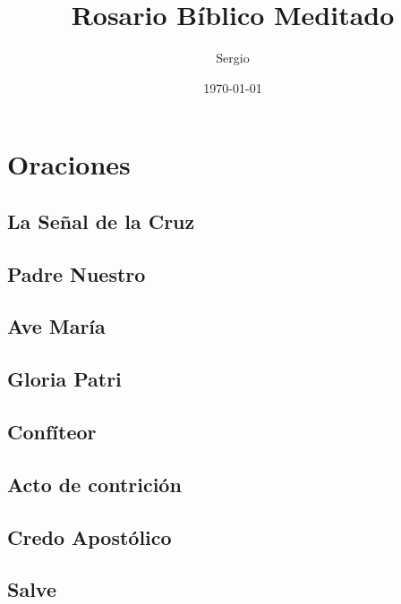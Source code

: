 \documentclass[11pt,a4paper]{report}
\title{Rosario Bíblico Meditado}
\author{Sergio}
\date{\today}
\begin{document}
    \maketitle

    \section*{Oraciones}

    \subsection*{La Señal de la Cruz}
    

    \subsection*{Padre Nuestro}
    

    \subsection*{Ave María}
    

    \subsection*{Gloria Patri}
    

    \subsection*{Confíteor}
    

    \subsection*{Acto de contrición}
    

    \subsection*{Credo Apostólico}
    

    \subsection*{Salve}
    
\end{document}
